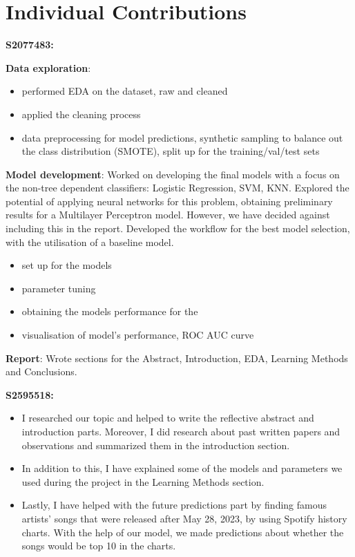 \documentclass{article}
\begin{document}
\begin{appendices}
\end{appendices}

\section{Individual Contributions}


\textbf{S2077483:}

\textbf{Data exploration}: 
\begin{itemize}
    \item performed EDA on the dataset, raw and cleaned
    \item applied the cleaning process
    \item data preprocessing for model predictions, synthetic sampling to balance out the class distribution (SMOTE), split up for the training/val/test sets 
\end{itemize}

\textbf{Model development}: Worked on developing the final models with a focus on the non-tree dependent classifiers: Logistic Regression, SVM, KNN. Explored the potential of applying neural networks for this problem, obtaining preliminary results for a Multilayer Perceptron model. However, we have decided against including this in the report. Developed the workflow for the best model selection, with the utilisation of a baseline model. 
\begin{itemize}
    \item set up for the models
    \item parameter tuning
    \item obtaining the models performance for the 
    \item visualisation of model's performance, ROC AUC curve
\end{itemize}

\textbf{Report}: Wrote sections for the Abstract, Introduction, EDA, Learning Methods and Conclusions. 


\textbf{S2595518:} 
\begin{itemize}
    \item I researched our topic and helped to write the reflective abstract and introduction parts. Moreover, I did research about past written papers and observations and summarized them in the introduction section.
    \item  In addition to this, I have explained some of the models and parameters we used during the project in the Learning Methods section. 
    \item  Lastly, I have helped with the future predictions part by finding famous artists' songs that were released after May 28, 2023, by using Spotify history charts. With the help of our model, we made predictions about whether the songs would be top 10 in the charts.
\end{itemize}
\end{document}
